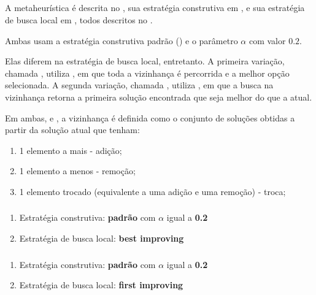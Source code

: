 \subsection{\grasp}
\label{subsection:grasp}

A metaheurística \grasp é descrita no , sua estratégia construtiva em , e sua estratégia de busca local em , todos descritos no .

Ambas usam a estratégia construtiva padrão () e o parâmetro $\alpha$ com valor $0.2$.

Elas diferem na estratégia de busca local, entretanto. A primeira variação, chamada \graspBest, utiliza \bestImproving, em que toda a vizinhança é percorrida e a melhor opção selecionada. A segunda variação, chamada \graspFirst, utiliza \firstImproving, em que a busca na vizinhança retorna a primeira solução encontrada que seja melhor do que a atual.

Em ambas, \bestImproving e \firstImproving, a vizinhança é definida como o conjunto de soluções obtidas a partir da solução atual que tenham:

\begin{enumerate}
    \item 1 elemento a mais - adição;
    \item 1 elemento a menos - remoção;
    \item 1 elemento trocado (equivalente a uma adição e uma remoção) - troca;
\end{enumerate}

\subsubsection{\graspBest}
\label{subsubsection:grasp-best}

\begin{enumerate}
    \item Estratégia construtiva: \textbf{padrão} com $\alpha$ igual a \textbf{0.2}
    \item Estratégia de busca local: \textbf{best improving}
\end{enumerate}

\subsubsection{\graspFirst}
\label{subsubsection:grasp-first}

\begin{enumerate}
    \item Estratégia construtiva: \textbf{padrão} com $\alpha$ igual a \textbf{0.2}
    \item Estratégia de busca local: \textbf{first improving}
\end{enumerate}
